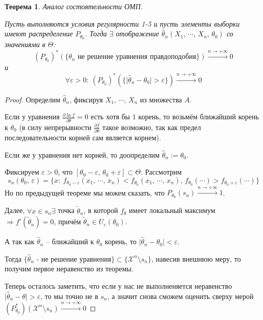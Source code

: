 \documentclass[a4paper,12pt]{article}
\theoremstyle{plain}
\newtheorem{theorem}{Теорема}[section]
\theoremstyle{definition}
\theoremstyle{remark}
\begin{document}
\begin{theorem}
  Аналог состоятельности ОМП.

  Пусть выполняются условия регулярности 1-5 и пусть элементы выборки имеют распределение $P_{\theta_0}$. Тогда $\exists$ отображение $\hat{\theta}_n(X_1,\,\cdots,\,X_n,\,\theta_0)$ со значениями в $\Theta$:
  \[
    (P_{\theta_0})^*(\{\theta_n \text{ не решение уравнения правдоподобия}\}) \overset{n \to +\infty}{\to} 0
  \]
  и
  \[
    \forall \varepsilon > 0 :\: (P_{\theta_0})^*(\{\vert\hat{\theta}_n - \theta_0\vert > \varepsilon\}) \overset{n \to +\infty}{\to} 0
  \]
\end{theorem}

\begin{proof}
  Определим $\hat{\theta}_n$, фиксируя $X_1,\,\cdots,\,X_n$ из множества $A$.

  Если у уравнения $\frac{\partial\ln f}{\partial\theta} = 0$ есть хотя бы $1$ корень, то возьмём ближайший корень к $\theta_0$ (в силу непрерывности $\frac{\partial f}{\partial \theta}$ такое возможно, так как предел последовательности корней сам является корнем).

  Если же у уравнения нет корней, то доопределим $\hat{\theta}_n := \theta_0$.

  Фиксируем $\varepsilon > 0$, что $[\theta_0 - \varepsilon,\, \theta_0 + \varepsilon] \subset \Theta$. Рассмотрим
  \[
    s_n(\theta_0,\, \varepsilon) = \{x :\: f_{\theta_0 - \varepsilon}(x_1,\,\cdots,\,x_n) < f_{\theta_0}(x_1,\,\cdots,\,x_n),\, f_{\theta_0}(\cdots) > f_{\theta_0 + \varepsilon}(\cdots)\}
  \]
  Но по предыдущей теореме мы можем сказать, что $P_{\theta_0}(s_n) \overset{n \to +\infty}{\to} 1$.

  Далее, $\forall x \in s_n \exists$ точка $\tilde{\theta}_n$, в которой $f_\theta$ имеет локальный максимум $\Rightarrow f'(\tilde{\theta}_n) = 0$, причём $\tilde{\theta}_n \in U_\varepsilon(\theta_0)$.

  А так как $\hat{\theta}_n$ -- ближайший к $\theta_0$ корень, то $\vert\hat{\theta}_n - \theta_0\vert < \varepsilon$.

  Тогда $\{\hat{\theta}_n \text{ - не решение уравнения}\} \subset \{\mathcal{X}^n \setminus s_n\}$, навесив внешнюю меру, то получим первое неравенство из теоремы.

  Теперь осталось заметить, что если у нас не выполненяется неравенство $\vert\hat{\theta}_n - \theta\vert > \varepsilon$, то мы точно не в $s_n$, а значит снова сможем оценить сверху мерой $(P_{\theta_0}^*)(\mathcal{X}^n \setminus s_n) \overset{n \to +\infty}{\to} 0$
\end{proof}
\end{document}
